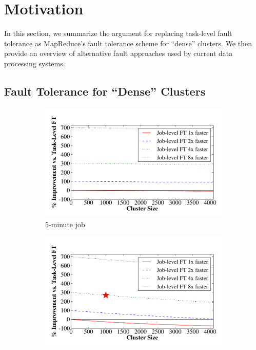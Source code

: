 \section{Motivation}
\label{sec:motivation}
\label{sec:assumptions}

In this section, we summarize the argument for replacing task-level fault
tolerance as MapReduce's fault tolerance scheme for ``dense'' clusters. We then
provide an overview of alternative fault approaches used by current data
processing systems.

\subsection{Fault Tolerance for ``Dense'' Clusters}
\label{sec:ft_provenance}

\begin{figure}[t]
\centering
\begin{subfigure}[t]{0.47\textwidth}
  \centering
  \includegraphics[width=\textwidth]{themis/graphs/analytical_failure_motivation/factor_5min}
  \caption{\label{fig:ft_motivation5} 5-minute job}
\end{subfigure}
\begin{subfigure}[t]{0.47\textwidth}
\centering
\includegraphics[width=\textwidth]{themis/graphs/analytical_failure_motivation/factor_60min}

\end{subfigure}
\end{figure}
